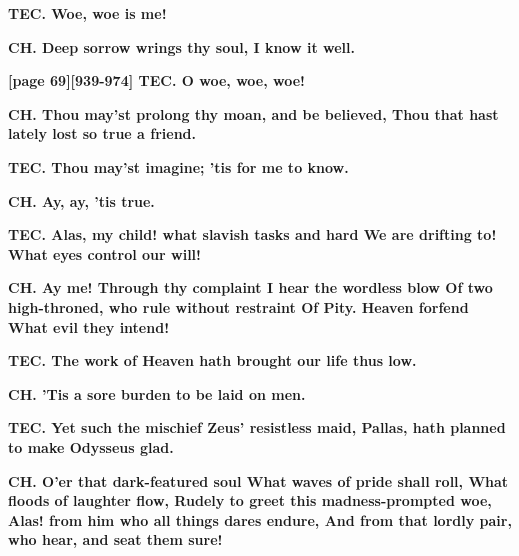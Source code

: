 \documentclass[11pt,letter]{book}
\begin{document}
\par \textbf{TEC. Woe, woe is me!}
\par 

\par \textbf{CH. Deep sorrow wrings thy soul, I know it well.}
\par 

\par \textbf{[page 69][939-974] TEC. O woe, woe, woe!}
\par 

\par \textbf{CH. Thou may’st prolong thy moan, and be believed, Thou that hast lately lost so true a friend.}
\par 

\par \textbf{TEC. Thou may’st imagine; ’tis for me to know.}
\par 

\par \textbf{CH. Ay, ay, ’tis true.}
\par 

\par \textbf{TEC. Alas, my child! what slavish tasks and hard We are drifting to! What eyes control our will!}
\par 

\par \textbf{CH. Ay me! Through thy complaint I hear the wordless blow Of two high-throned, who rule without restraint Of Pity. Heaven forfend What evil they intend!}
\par 

\par \textbf{TEC. The work of Heaven hath brought our life thus low.}
\par 

\par \textbf{CH. ’Tis a sore burden to be laid on men.}
\par 

\par \textbf{TEC. Yet such the mischief Zeus’ resistless maid, Pallas, hath planned to make Odysseus glad.}
\par 

\par \textbf{CH. O’er that dark-featured soul What waves of pride shall roll, What floods of laughter flow, Rudely to greet this madness-prompted woe, Alas! from him who all things dares endure, And from that lordly pair, who hear, and seat them sure!}
\par 
\end{document}
